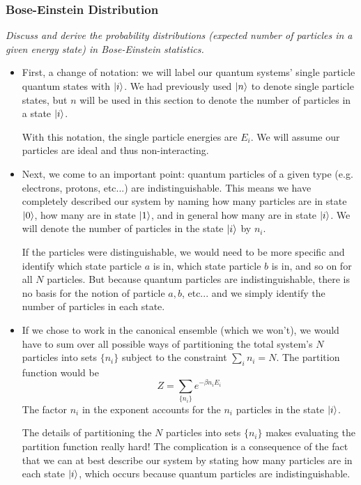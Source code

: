 \documentclass[11pt, a4paper]{article}
\begin{document}
\subsubsection{Bose-Einstein Distribution}
\textit{Discuss and derive the probability distributions (expected number of particles in a given energy state) in Bose-Einstein statistics.}

\begin{itemize}
	\item First, a change of notation: we will label our quantum systems' single particle quantum states with $ \ket{i} $. We had previously used $ \ket{n} $ to denote single particle states, but $ n $ will be used in this section to denote the number of particles in a state $ \ket{i} $.
	
	With this notation, the single particle energies are $ E_{i} $. We will assume our particles are ideal and thus non-interacting. 
	
	\item Next, we come to an important point: quantum particles of a given type (e.g. electrons, protons, etc...) are indistinguishable. This means we have completely described our system by naming how many particles are in state $ \ket{0} $, how many are in state $ \ket{1} $, and in general how many are in state $ \ket{i} $. We will denote the number of particles in the state $ \ket{i} $  by $ n_{i} $. 
	
	If the particles were distinguishable, we would need to be more specific and identify which state particle $ a $ is in, which state particle $ b $ is in, and so on for all $ N $ particles. But because quantum particles are indistinguishable, there is no basis for the notion of particle $ a, b $, etc... and we simply identify the number of particles in each state. 
	

	
	\item If we chose to work in the canonical ensemble (which we won't), we would have to sum over all possible ways of partitioning the total system's $ N $ particles into sets $ \{n_{i}\} $ subject to the constraint $ \sum_{i}n_{i} = N $. The partition function would be
	\begin{equation*}
		Z = \sum_{\{n_{i}\}} e^{-\beta n_{i}E_{i}}
	\end{equation*}
	The factor $ n_{i} $ in the exponent accounts for the $ n_{i} $ particles in the state $ \ket{i} $. 
	
	The details of partitioning the $ N $ particles into sets $ \{n_{i}\} $ makes evaluating the partition function really hard! The complication is a consequence of the fact that we can at best describe our system by stating how many particles are in each state $ \ket{i} $, which occurs because quantum particles are indistinguishable.
	

\end{itemize}
\end{document}
